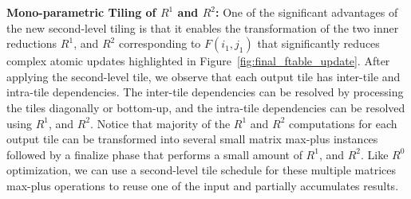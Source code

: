 \textbf{Mono-parametric Tiling of $R^{1}$ and $R^{2}$:}
One of the significant advantages of the new second-level tiling is that it enables the transformation of the two inner reductions $R^{1}$, and $R^{2}$ corresponding to $F(i_{1}, j_{1})$ that significantly reduces complex atomic updates highlighted in Figure~\ref{fig:final_ftable_update}. After applying the second-level tile, we observe that each output tile has inter-tile and intra-tile dependencies. The inter-tile dependencies can be resolved by processing the tiles diagonally or bottom-up, and the intra-tile dependencies can be resolved using $R^{1}$, and $R^{2}$. Notice that majority of the $R^{1}$ and $R^{2}$ computations for each output tile can be transformed into several small matrix max-plus instances followed by a finalize phase that performs a small amount of $R^{1}$, and $R^{2}$. Like $R^{0}$ optimization, we can use a second-level tile schedule for these multiple matrices max-plus operations to reuse one of the input and partially accumulates results. 
